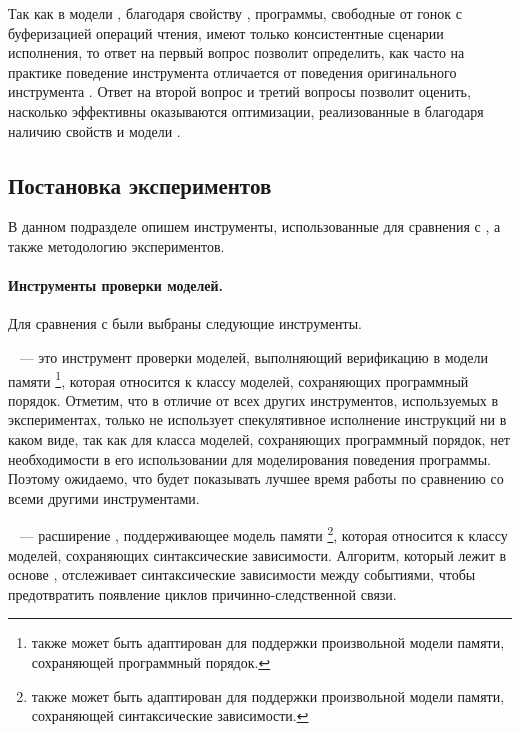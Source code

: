 Так как в модели \WkmS, благодаря свойству \LBRF, программы, 
свободные от гонок с буферизацией операций чтения, 
имеют только \RCMM консистентные сценарии исполнения, 
то ответ на первый вопрос позволит определить, как часто 
на практике поведение инструмента \wmc отличается от поведения 
оригинального инструмента \genmc.
Ответ на второй вопрос и третий вопросы позволит оценить, насколько эффективны 
оказываются оптимизации, реализованные в \wmc благодаря 
наличию свойств \LBRF и \CL  модели \WkmS.


\subsection*{Постановка экспериментов}

В данном подразделе опишем инструменты, использованные для сравнения 
с \wmc, а также методологию экспериментов.

\paragraph{Инструменты проверки моделей.}

Для сравнения с  \wmc были выбраны следующие инструменты. 

\textbf{\genmc}~\cite{Kokologiannakis:PLDI2019,Kokologiannakis:CAD2021} ---
это инструмент проверки моделей, выполняющий верификацию в модели памяти \RCMM%
\footnote{\genmc также может быть адаптирован для поддержки 
  произвольной модели памяти, сохраняющей программный порядок.}, 
которая относится к классу моделей, сохраняющих программный порядок.  
Отметим, что в отличие от всех других инструментов, используемых в экспериментах, 
только \genmc не использует спекулятивное исполнение инструкций 
ни в каком виде, так как для класса моделей, сохраняющих программный порядок,
нет необходимости в его использовании для моделирования поведения программы. 
Поэтому ожидаемо, что \genmc будет показывать 
лучшее время работы по сравнению со всеми другими инструментами. 

\textbf{\hmc}~\cite{Kokologiannakis-Vafeiadis:ASPLOS2020} --- 
расширение \genmc, поддерживающее модель памяти \IMM
\footnote{\hmc также может быть адаптирован для поддержки 
  произвольной модели памяти, сохраняющей синтаксические зависимости.},
которая относится к классу моделей, сохраняющих синтаксические зависимости.  
Алгоритм, который лежит в основе \hmc, отслеживает синтаксические зависимости между событиями, 
чтобы предотвратить появление циклов причинно-следственной связи. 

